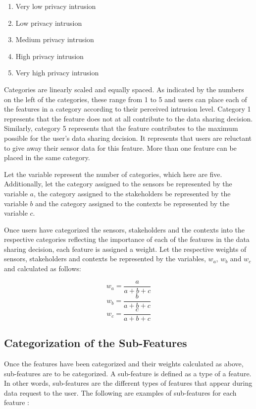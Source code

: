 \begin{enumerate}
\item Very low privacy intrusion
\item Low privacy intrusion
\item Medium privacy intrusion
\item High privacy intrusion
\item Very high privacy intrusion
\end{enumerate}

Categories are linearly scaled and equally spaced. As indicated by the numbers on the left of the categories, these range from 1 to 5 and users can place each of the features in a category according to their perceived intrusion level. Category 1 represents that the feature does not at all contribute to the data sharing decision. Similarly, category 5 represents that the feature contributes to the maximum possible for the user's data sharing decision. It represents that users are reluctant to give away their sensor data for this feature. More than one feature can be placed in the same category.

Let the variable \numcategories represent the number of categories, which here are five. Additionally, let the category assigned to the sensors be represented by the variable $a$, the category assigned to the stakeholders be represented by the variable $b$ and the category assigned to the contexts be represented by the variable $c$.

Once users have categorized the sensors, stakeholders and the contexts into the respective categories reflecting the importance of each of the features in the data sharing decision, each feature is assigned a weight. Let the respective weights of sensors, stakeholders and contexts be represented by the variables, $w_{a}$, $w_{b}$ and $w_{c}$ and calculated as follows:

\begin{equation}
   w_{a} = \frac{a}{a+b+c} 
\end{equation}
\begin{equation}
   w_{b} = \frac{b}{a+b+c}   
\end{equation}
\begin{equation}
   w_{c} = \frac{c}{a+b+c}   
\end{equation}

\subsection{Categorization of the Sub-Features}
Once the features have been categorized and their weights calculated as above, sub-features are to be categorized. A sub-feature
is defined as a type of a feature. In other words, sub-features are the different types of features that appear during data request to the user. The following are examples of sub-features for each feature :

